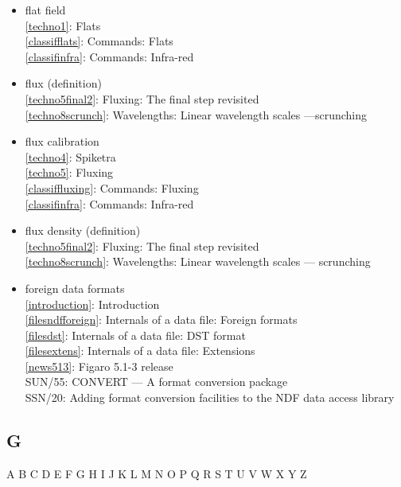 \documentclass[11pt,twoside]{article}
\newcommand{\htmlref}[2]{#1}
\newcommand{\xref}[3]{#1}
\newcommand{\idxint}[2]{\ref{#1}: \htmlref{#2}{#1}}
\newcommand{\idxint}[2]{\htmlref{#2}{#1}}
\newcommand{\latorhtm}[2]{#1}
\newcommand{\latorhtm}[2]{#2}
\begin{document}
\begin{itemize}
\item flat field\\
   \idxint{techno1}{Flats}\\
   \idxint{classifflats}{Commands: Flats}\\
   \idxint{classifinfra}{Commands: Infra-red}
\item flux (definition)\\
   \idxint{techno5final2}{Fluxing: The final step revisited}\\
   \idxint{techno8scrunch}{Wavelengths: Linear wavelength scales
                          \latorhtm{---}{-}scrunching}
\item flux calibration\\
   \idxint{techno4}{Spiketra}\\
   \idxint{techno5}{Fluxing}\\
   \idxint{classiffluxing}{Commands: Fluxing}\\
   \idxint{classifinfra}{Commands: Infra-red}
\item flux density (definition)\\
   \idxint{techno5final2}{Fluxing: The final step revisited}\\
   \idxint{techno8scrunch}{Wavelengths: Linear wavelength scales
                           \latorhtm{---}{-} scrunching}
\item foreign data formats\\
   \idxint{introduction}{Introduction}\\
   \idxint{filesndfforeign}{Internals of a data file: Foreign formats}\\
   \idxint{filesdst}{Internals of a data file: DST format}\\
   \idxint{filesextens}{Internals of a data file: Extensions}\\
   \idxint{news513}{Figaro 5.1-3 release}\\
   \xref{SUN/55: CONVERT \latorhtm{---}{-} A format conversion package}{sun55}{}\\
   \xref{SSN/20: Adding format conversion facilities to the NDF data
      access library}{ssn20}{}
\end{itemize}

\subsection*{\label{index_G}G}

\begin{htmlonly}
\htmlref{A}{index_A}
\htmlref{B}{index_B}
\htmlref{C}{index_C}
\htmlref{D}{index_D}
\htmlref{E}{index_E}
\htmlref{F}{index_F}
G
\htmlref{H}{index_H}
\htmlref{I}{index_I}
\htmlref{J}{index_J}
\htmlref{K}{index_K}
\htmlref{L}{index_L}
\htmlref{M}{index_M}
\htmlref{N}{index_N}
\htmlref{O}{index_O}
\htmlref{P}{index_P}
\htmlref{Q}{index_Q}
\htmlref{R}{index_R}
\htmlref{S}{index_S}
\htmlref{T}{index_T}
\htmlref{U}{index_U}
\htmlref{V}{index_V}
\htmlref{W}{index_W}
\htmlref{X}{index_X}
\htmlref{Y}{index_Y}
Z
\end{htmlonly}
\end{document}
